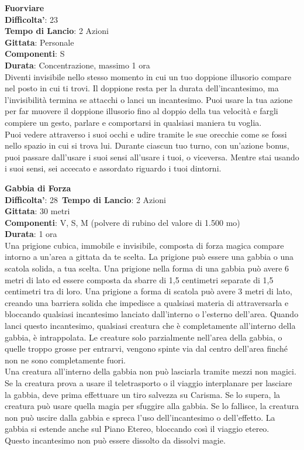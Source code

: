 \begin{multicols}{2}
\medskip\textbf{Fuorviare}\\
\textbf{Difficolta'}: 23\\
\textbf{Tempo di Lancio}: 2 Azioni\\
\textbf{Gittata}: Personale\\
\textbf{Componenti}: S\\
\textbf{Durata}: Concentrazione, massimo 1 ora\\
Diventi invisibile nello stesso momento in cui un tuo doppione illusorio compare nel posto in cui ti trovi. Il doppione resta per la durata dell’incantesimo, ma l’invisibilità termina se attacchi o lanci un incantesimo. Puoi usare la tua azione per far muovere il doppione illusorio fino al doppio della tua velocità e fargli compiere un gesto, parlare e comportarsi in qualsiasi maniera tu voglia.\\
Puoi vedere attraverso i suoi occhi e udire tramite le sue orecchie come se fossi nello spazio in cui si trova lui. Durante ciascun tuo turno, con un’azione bonus, puoi passare dall’usare i suoi sensi all’usare i tuoi, o viceversa. Mentre stai usando i suoi sensi, sei accecato e assordato riguardo i tuoi dintorni. 

\medskip\textbf{Gabbia di Forza}\\
\textbf{Difficolta'}: 28\
\textbf{Tempo di Lancio}: 2 Azioni\\
\textbf{Gittata}: 30 metri\\
\textbf{Componenti}: V, S, M (polvere di rubino del valore di 1.500 mo)\\
\textbf{Durata}: 1 ora\\
Una prigione cubica, immobile e invisibile, composta di forza magica compare intorno a un’area a gittata da te scelta. La prigione può essere una gabbia o una scatola solida, a tua scelta. Una prigione nella forma di una gabbia può avere 6 metri di lato ed essere composta da sbarre di 1,5 centimetri separate di 1,5 centimetri tra di loro. Una prigione a forma di scatola può avere 3 metri di lato, creando una barriera solida che impedisce a qualsiasi materia di attraversarla e bloccando qualsiasi incantesimo lanciato dall’interno o l’esterno dell’area. Quando lanci questo incantesimo, qualsiasi creatura che è completamente all’interno della gabbia, è intrappolata. Le creature solo parzialmente nell’area della gabbia, o quelle troppo grosse per entrarvi, vengono spinte via dal centro dell’area finché non ne sono completamente fuori.\\
Una creatura all’interno della gabbia non può lasciarla tramite mezzi non magici. Se la creatura prova a usare il teletrasporto o il viaggio interplanare per lasciare la gabbia, deve prima effettuare un tiro salvezza su Carisma. Se lo supera, la creatura può usare quella magia per sfuggire alla gabbia. Se lo fallisce, la creatura non può uscire dalla gabbia e spreca l’uso dell’incantesimo o dell’effetto. La gabbia si estende anche sul Piano Etereo, bloccando così il viaggio etereo.\\
Questo incantesimo non può essere dissolto da dissolvi magie.


\end{multicols}
